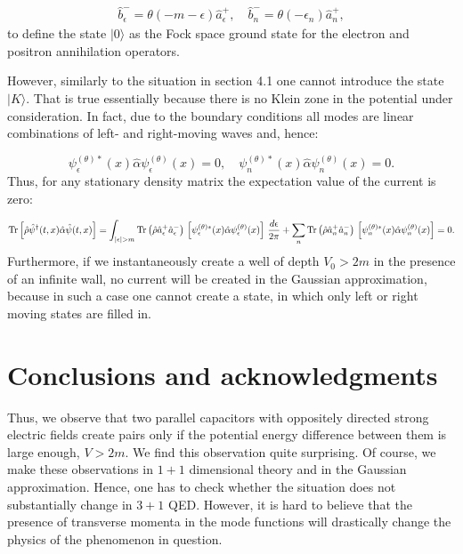 \documentclass[12pt]{article}
\begin{document}
\begin{eqnarray}
    \hat{b}^{-}_{\epsilon}=\theta(-m-\epsilon)\hat{a}^{+}_{\epsilon}, \quad \hat{b}^{-}_{n}=\theta(-\epsilon_n)\hat{a}^{+}_{n},
\end{eqnarray}
to define the state $|0\rangle$ as the Fock space ground state for the electron and positron annihilation operators. 

However, similarly to the situation in section 4.1 one cannot introduce the state $|K\rangle$. That is true essentially because there is no Klein zone in the potential under consideration.  In fact, due to the boundary conditions all modes are linear combinations of left- and right-moving waves and, hence:

\[\psi^{(\theta)*}_{\epsilon}(x)\hat{\alpha}\psi^{(\theta)}_{\epsilon}(x)=0, \quad \psi^{(\theta)*}_{n}(x)\hat{\alpha}\psi^{(\theta)}_{n}(x)=0.\]
Thus, for any stationary density matrix the expectation value of the current is zero:

	\[{\rm Tr}\left[\hat{\rho}\hat{\psi}^{\dagger}(t,x)\hat{\alpha}\hat{\psi}(t,x)\right] =\int_{|\epsilon|>m}{\rm Tr}\left(\hat{\rho}\hat{a}^{+}_{\epsilon}\hat{a}^{-}_{\epsilon}\right) \, \left[\psi^{(\theta)*}_{\epsilon}(x)\hat{\alpha}\psi^{(\theta)}_{\epsilon}(x) \right] \, \frac{d\epsilon}{2\pi} + \sum_{n} {\rm Tr} \left(\hat{\rho}\hat{a}^{+}_{n}\hat{a}^{-}_{n}\right) \, \left[\psi^{(\theta)*}_{n}(x)\hat{\alpha}\psi^{(\theta)}_{n}(x)\right] = 0.\]
Furthermore, if we instantaneously create a well of depth $V_0>2m$  in the presence of an infinite wall, no current will be created in the Gaussian approximation, because in such a case one cannot create a state, in which only left or right moving states are filled in.

\section{Conclusions and acknowledgments}

Thus, we observe that two parallel capacitors with oppositely directed strong electric fields create pairs only if the potential energy difference between them is large enough, $V>2m$. We find this observation quite surprising. Of course, we make these observations in $1+1$ dimensional theory and in the Gaussian approximation. Hence, one has to check whether the situation does not substantially change in $3+1$ QED. However, it is hard to believe that the presence of transverse momenta in the mode functions will drastically change the physics of the phenomenon in question.  
\end{document}
